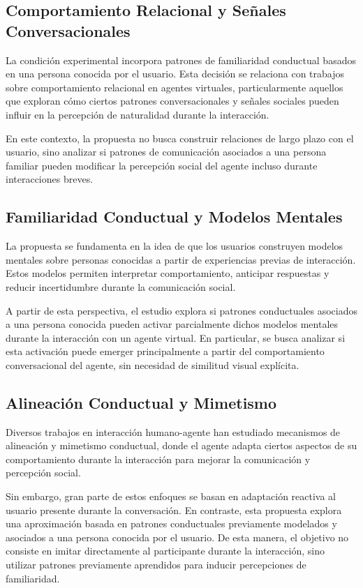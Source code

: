 \documentclass[12pt]{article}
\begin{document}
\subsection{Comportamiento Relacional y Señales Conversacionales}

La condición experimental incorpora patrones de familiaridad conductual basados en una persona conocida por el usuario. Esta decisión se relaciona con trabajos sobre comportamiento relacional en agentes virtuales, particularmente aquellos que exploran cómo ciertos patrones conversacionales y señales sociales pueden influir en la percepción de naturalidad durante la interacción.

En este contexto, la propuesta no busca construir relaciones de largo plazo con el usuario, sino analizar si patrones de comunicación asociados a una persona familiar pueden modificar la percepción social del agente incluso durante interacciones breves.

\subsection{Familiaridad Conductual y Modelos Mentales}

La propuesta se fundamenta en la idea de que los usuarios construyen modelos mentales sobre personas conocidas a partir de experiencias previas de interacción. Estos modelos permiten interpretar comportamiento, anticipar respuestas y reducir incertidumbre durante la comunicación social.

A partir de esta perspectiva, el estudio explora si patrones conductuales asociados a una persona conocida pueden activar parcialmente dichos modelos mentales durante la interacción con un agente virtual. En particular, se busca analizar si esta activación puede emerger principalmente a partir del comportamiento conversacional del agente, sin necesidad de similitud visual explícita.

\subsection{Alineación Conductual y Mimetismo}

Diversos trabajos en interacción humano-agente han estudiado mecanismos de alineación y mimetismo conductual, donde el agente adapta ciertos aspectos de su comportamiento durante la interacción para mejorar la comunicación y percepción social.

Sin embargo, gran parte de estos enfoques se basan en adaptación reactiva al usuario presente durante la conversación. En contraste, esta propuesta explora una aproximación basada en patrones conductuales previamente modelados y asociados a una persona conocida por el usuario. De esta manera, el objetivo no consiste en imitar directamente al participante durante la interacción, sino utilizar patrones previamente aprendidos para inducir percepciones de familiaridad.





\printbibliography
\end{document}
